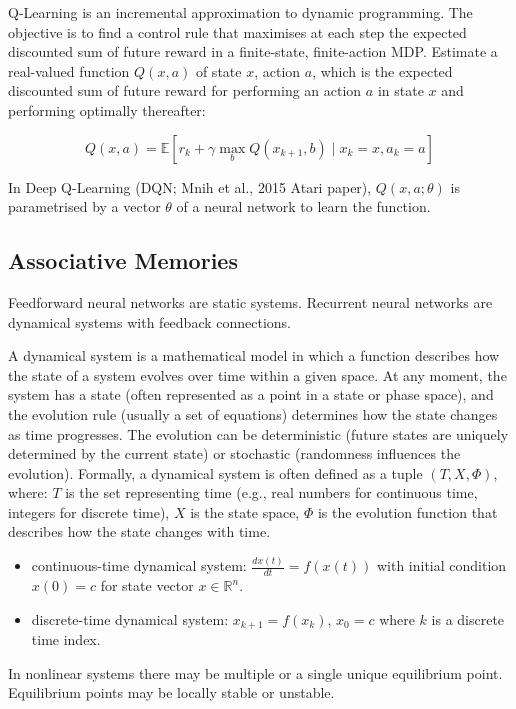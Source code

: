 Q-Learning is an incremental approximation to dynamic programming.
The objective is to find a control rule that maximises at each step
the expected discounted sum of future reward in a finite-state, finite-action MDP.
Estimate a real-valued function $Q(x, a)$ of state $x$, action $a$,
which is the expected discounted sum of future reward for
performing an action $a$ in state $x$ and performing optimally thereafter:

$$
Q(x, a) = \mathbb{E}[r_k + \gamma \max_b{ Q(x_{k+1}, b) } \mid x_k = x, a_k = a]
$$

In Deep Q-Learning (DQN; Mnih et al., 2015 Atari paper),
$Q(x, a; \theta)$ is parametrised by a vector $\theta$
of a neural network to learn the function.


\newpage
\subsection{Associative Memories}

Feedforward neural networks are static systems.
Recurrent neural networks are dynamical systems with feedback connections.

A dynamical system is a mathematical model in which a function describes how the state of a system evolves over time within a given space. At any moment, the system has a state (often represented as a point in a state or phase space), and the evolution rule (usually a set of equations) determines how the state changes as time progresses. The evolution can be deterministic (future states are uniquely determined by the current state) or stochastic (randomness influences the evolution).
Formally, a dynamical system is often defined as a tuple $(T, X, \Phi)$, where:
$T$ is the set representing time (e.g., real numbers for continuous time, integers for discrete time),
$X$ is the state space,
$\Phi$ is the evolution function that describes how the state changes with time.

\begin{itemize}
    \item continuous-time dynamical system: $\frac{dx(t)}{dt} = f(x(t))$ with initial condition $x(0) = c$ for state vector $x \in \mathbb{R}^n$.
    \item discrete-time dynamical system: $x_{k+1} = f(x_k), \, x_0 = c$ where $k$ is a discrete time index.
\end{itemize}

In nonlinear systems there may be multiple or a single unique equilibrium point.
Equilibrium points may be locally stable or unstable.

